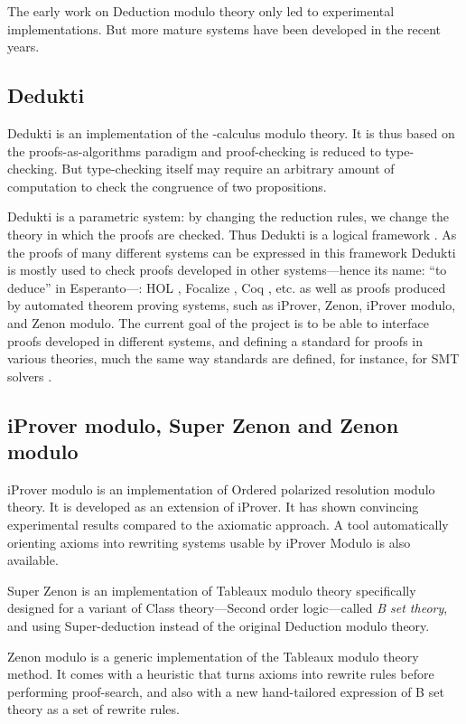 \documentclass{llncs}
\begin{document}
The early work on Deduction modulo theory only led to experimental 
implementations. But more mature systems have been developed in the 
recent years.

\subsection{Dedukti}

Dedukti \cite{Boespflug,BCH,Saillard} 
is an implementation of the -calculus modulo
theory.  It is thus based on the proofs-as-algorithms paradigm and
proof-checking is reduced to type-checking. But type-checking itself
may require an arbitrary amount of computation to check the congruence
of two propositions.

Dedukti is a parametric system: by changing the reduction rules, we
change the theory in which the proofs are checked. Thus Dedukti is a
logical framework \cite{HHP}. As the proofs of many different systems
can be expressed in this framework Dedukti is mostly used to check
proofs developed in other systems---hence its name: ``to deduce'' in
Esperanto---: HOL \cite{Assafmaster}, Focalize \cite{Cauderlier}, Coq
\cite{BoespflugBurel,Assaf}, etc. as well as proofs produced by
automated theorem proving systems, such as iProver, Zenon, iProver
modulo, and Zenon modulo.  The current goal of the project is to be
able to interface proofs developed in different systems, and defining
a standard for proofs in various theories, much the same way standards
are defined, for instance, for SMT solvers
\cite{BessonFontaineThery,StumpOeReynoldsHarareanTinelli}.

\subsection{iProver modulo, Super Zenon and Zenon modulo}

iProver modulo \cite{Burel11} 
is an implementation of Ordered polarized resolution modulo theory.
It is developed as an extension of iProver.
It has shown convincing experimental results compared to the axiomatic
approach. A tool automatically orienting axioms into rewriting systems
usable by iProver Modulo is also available.


Super Zenon \cite{JBDD} 
is an implementation of Tableaux modulo theory specifically 
designed for a variant of Class theory---Second order logic---called 
{\em B set theory}, and using Super-deduction instead of the original 
Deduction modulo theory.

Zenon modulo \cite{DDGHH1,DDGHH}
is a generic implementation of the Tableaux modulo theory method. 
It comes with a heuristic that turns axioms into rewrite rules before 
performing proof-search, and also with a new hand-tailored expression of 
B set theory as a set of rewrite rules.
\end{document}

